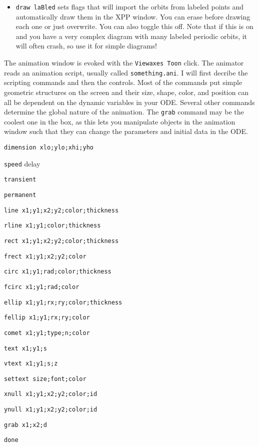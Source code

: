 \documentclass{article}
\begin{document}
\begin{itemize}
\begin{itemize}
\item {\tt draw laBled} sets flags that will import the orbits from labeled points and automatically draw them in the XPP window. You can erase before drawing each one or just overwrite. You can also toggle this off.  Note that if this is on and you have a very complex diagram with many labeled periodic orbits, it will often crash, so use it for simple diagrams!
\end{itemize}

\end{itemize}

\bigskip
{}

The animation window is evoked with the {\tt Viewaxes Toon} click. The animator reads an animation script, usually called {\tt something.ani}. I will first decribe the scripting commands and then the controls. Most of the commands put simple geometric structures on the screen and their size, shape, color, and position can all be dependent on the dynamic variables in your ODE. Several other commands determine the global nature of the animation. The {\tt grab} command may be the coolest one in the box, as this lets you manipulate objects in the animation window such that they can change the parameters and initial data in the ODE. 


\begin{description}
\item{\tt dimension xlo;ylo;xhi;yho}
\item{\tt speed} delay
\item{\tt transient}
\item{\tt permanent}
\item{\tt line x1;y1;x2;y2;color;thickness}
\item{\tt rline x1;y1;color;thickness}
\item{\tt rect x1;y1;x2;y2;color;thickness}
\item{\tt frect x1;y1;x2;y2;color}
\item{\tt circ x1;y1;rad;color;thickness}
\item{\tt fcirc x1;y1;rad;color}
\item{\tt ellip x1;y1;rx;ry;color;thickness}
\item{\tt fellip x1;y1;rx;ry;color}
\item{\tt comet x1;y1;type;n;color}
\item{\tt text x1;y1;s}
\item{\tt vtext x1;y1;s;z}
\item{\tt settext size;font;color}
\item{\tt xnull x1;y1;x2;y2;color;id}
\item{\tt ynull x1;y1;x2;y2;color;id}
\item{\tt grab x1;x2;d}


\item{\tt done}
\end{description}
\end{document}
